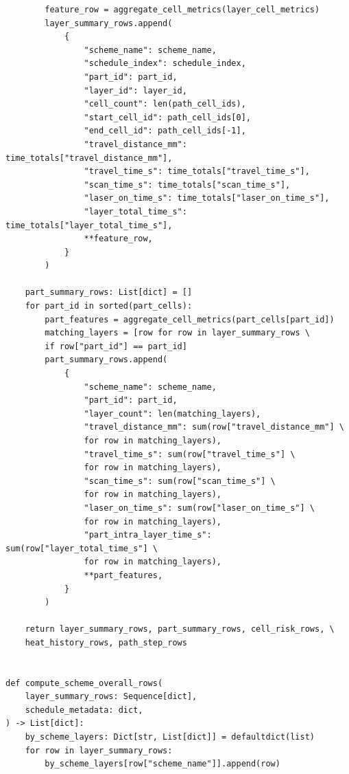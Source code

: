 \documentclass[a4paper, 12pt]{ctexart}
\begin{document}
\begin{verbatim}
        feature_row = aggregate_cell_metrics(layer_cell_metrics)
        layer_summary_rows.append(
            {
                "scheme_name": scheme_name,
                "schedule_index": schedule_index,
                "part_id": part_id,
                "layer_id": layer_id,
                "cell_count": len(path_cell_ids),
                "start_cell_id": path_cell_ids[0],
                "end_cell_id": path_cell_ids[-1],
                "travel_distance_mm": time_totals["travel_distance_mm"],
                "travel_time_s": time_totals["travel_time_s"],
                "scan_time_s": time_totals["scan_time_s"],
                "laser_on_time_s": time_totals["laser_on_time_s"],
                "layer_total_time_s": time_totals["layer_total_time_s"],
                **feature_row,
            }
        )

    part_summary_rows: List[dict] = []
    for part_id in sorted(part_cells):
        part_features = aggregate_cell_metrics(part_cells[part_id])
        matching_layers = [row for row in layer_summary_rows \
        if row["part_id"] == part_id]
        part_summary_rows.append(
            {
                "scheme_name": scheme_name,
                "part_id": part_id,
                "layer_count": len(matching_layers),
                "travel_distance_mm": sum(row["travel_distance_mm"] \
                for row in matching_layers),
                "travel_time_s": sum(row["travel_time_s"] \
                for row in matching_layers),
                "scan_time_s": sum(row["scan_time_s"] \
                for row in matching_layers),
                "laser_on_time_s": sum(row["laser_on_time_s"] \
                for row in matching_layers),
                "part_intra_layer_time_s": sum(row["layer_total_time_s"] \
                for row in matching_layers),
                **part_features,
            }
        )

    return layer_summary_rows, part_summary_rows, cell_risk_rows, \
    heat_history_rows, path_step_rows


def compute_scheme_overall_rows(
    layer_summary_rows: Sequence[dict],
    schedule_metadata: dict,
) -> List[dict]:
    by_scheme_layers: Dict[str, List[dict]] = defaultdict(list)
    for row in layer_summary_rows:
        by_scheme_layers[row["scheme_name"]].append(row)


\end{verbatim}
\end{document}

